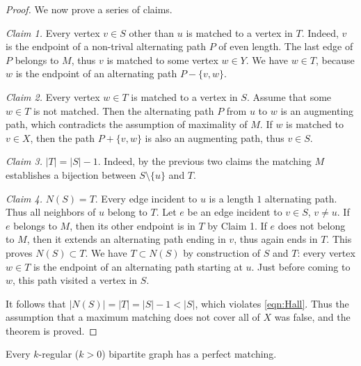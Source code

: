 \begin{page}
\begin{proof}
We now prove a series of claims.

\emph{Claim 1.} Every vertex $v \in S$ other than $u$ is matched to a vertex in $T$.
Indeed, $v$ is the endpoint of a non-trival alternating path $P$ of even length.
The last edge of $P$ belongs to $M$, thus $v$ is matched to some vertex $w \in Y$.
We have $w \in T$, because $w$ is the endpoint of an alternating path $P - \{v,w\}$.

\emph{Claim 2.} Every vertex $w \in T$ is matched to a vertex in $S$.
Assume that some $w \in T$ is not matched.
Then the alternating path $P$ from $u$ to $w$ is an augmenting path, which contradicts the assumption of maximality of $M$.
If $w$ is matched to $v \in X$, then the path $P + \{v,w\}$ is also an augmenting path, thus $v \in S$.

\emph{Claim 3.} $|T| = |S| - 1$.
Indeed, by the previous two claims the matching $M$ establishes a bijection between $S \setminus \{u\}$ and $T$.

\emph{Claim 4.} $N(S) = T$.
Every edge incident to $u$ is a length $1$ alternating path.
Thus all neighbors of $u$ belong to $T$.
Let $e$ be an edge incident to $v \in S$, $v \ne u$.
If $e$ belongs to $M$, then its other endpoint is in $T$ by Claim 1.
If $e$ does not belong to $M$, then it extends an alternating path ending in $v$, thus again ends in $T$.
This proves $N(S) \subset T$.
We have $T \subset N(S)$ by construction of $S$ and $T$: every vertex $w \in T$ is the endpoint of an alternating path starting at $u$.
Just before coming to $w$, this path visited a vertex in $S$.

It follows that $|N(S)| = |T| = |S| - 1 < |S|$, which violates \eqref{eqn:Hall}.
Thus the assumption that a maximum matching does not cover all of $X$ was false, and the theorem is proved.
\end{proof}



\end{page}

\begin{page}
\setcounter{section}{4}
\setcounter{subsection}{4}
\setcounter{dfn}{8}
\label{portion:345}

\begin{cor}
Every $k$-regular ($k>0$) bipartite graph has a perfect matching.
\end{cor}

\end{page}

